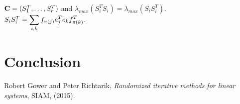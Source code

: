 $\bold{C} = (S_{1}^{T},\dots,S_{r}^{T})$ and $\lambda_{max}(S_{i}^{T}S_{i}) = \lambda_{max}(S_{i}S_{i}^{T}).$\\
$S_{i} S_{i}^{T} = \displaystyle\sum_{i,k} f_{\pi(j)}e_{j}^{T} e_{k}f_{\pi(k)}^{T}$.\\


\chapter{Conclusion}

\appendix
\begin{thebibliography}{1}

\bibitem{}
{\sc Robert Gower and Peter Richtarik}, {\em Randomized iterative methods for linear systems}, SIAM, 
  (2015).



\end{thebibliography}





